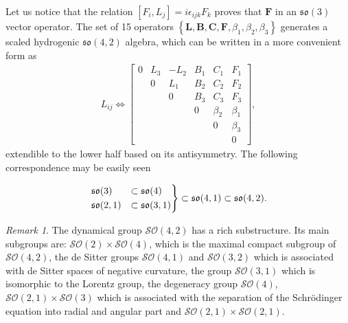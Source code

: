 \documentclass[12pt,a4paper]{report}
\theoremstyle{definition}
\theoremstyle{remark}
\newtheorem*{remark}{Remark}
\theoremstyle{remark}
\begin{document}
Let us notice that the relation $[F_i,L_j]=i\epsilon_{ijk}F_k$ proves that $\textbf{F}$ in an $\mathfrak{so}(3)$ vector operator. The set of 15 operators $\left\lbrace \textbf{L},\textbf{B},\textbf{C},\textbf{F}, \beta_1,\beta_2,\beta_3 \right\rbrace$ generates a scaled hydrogenic $\mathfrak{so}(4,2)$ algebra, which can be written in a more convenient form as
\begin{align*}
L_{ij}\Longleftrightarrow \begin{bmatrix}
0 & L_3 & -L_2 & B_1      & C_1     & F_1 \\
  & 0   & L_1  & B_2      & C_2     & F_2 \\
  &     & 0    & B_3      & C_3     & F_3 \\
  &     &      & 0        & \beta_2 & \beta_1 \\
  &     &      &          & 0       & \beta_3 \\
  &     &      &          &         & 0
\end{bmatrix},
\end{align*}
extendible to the lower half based on its antisymmetry. The following correspondence may be easily seen

\begin{align*}
\begin{rcases}
\mathfrak{so}(3)&\subset\mathfrak{so}(4)\\
\mathfrak{so}(2,1)&\subset\mathfrak{so}(3,1)
\end{rcases}
\subset\mathfrak{so}(4,1)\subset\mathfrak{so}(4,2).
\end{align*}

\begin{remark}
The dynamical group $\mathcal{SO}(4,2)$ has a rich substructure. Its main subgroups are: $\mathcal{SO}(2)\times\mathcal{SO}(4)$, which is the maximal compact subgroup of $\mathcal{SO}(4,2)$, the de Sitter groups $\mathcal{SO}(4,1)$ and $\mathcal{SO}(3,2)$ which is associated with de Sitter spaces of negative curvature, the group $\mathcal{SO}(3,1)$ which is isomorphic to the Lorentz group, the degeneracy group $\mathcal{SO}(4)$, $\mathcal{SO}(2,1)\times\mathcal{SO}(3)$ which is associated  with the separation of the Schrödinger equation into radial and angular part and  $\mathcal{SO}(2,1)\times\mathcal{SO}(2,1)$.
\end{remark}
\end{document}
